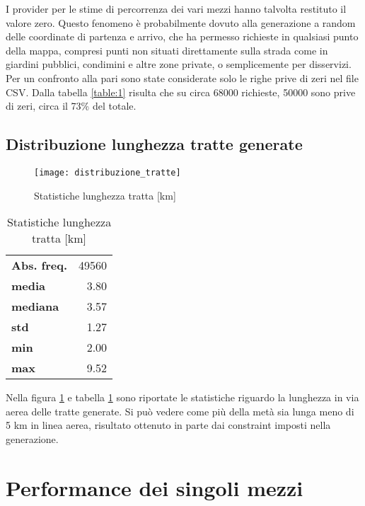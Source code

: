 I provider per le stime di percorrenza dei vari mezzi hanno talvolta restituto il valore zero. Questo fenomeno è probabilmente dovuto alla generazione a random delle coordinate di partenza e arrivo, che ha permesso richieste in qualsiasi punto della mappa, compresi punti non situati direttamente sulla strada come in giardini pubblici, condimini e altre zone private, o semplicemente per disservizi. Per un confronto alla pari sono state considerate solo le righe prive di zeri nel file CSV. Dalla tabella \ref{table:1}  risulta che su circa 68000 richieste, 50000 sono prive di zeri, circa il 73\% del totale.

\subsection{Distribuzione lunghezza tratte generate}

\begin{figure}[H]
\texttt{[image: distribuzione\_tratte]}
\caption{Statistiche lunghezza tratta [km]}
\label{image:2}
\end{figure}

\begin{table}[H]
\centering
\begin{tabular}{ | l r | }
\hline
\textbf{Abs. freq.} & 49560 \\
\textbf{media} & 3.80 \\
\textbf{mediana} & 3.57 \\
\textbf{std} & 1.27 \\
\textbf{min} & 2.00 \\
\textbf{max} & 9.52 \\
\hline
\end{tabular}
\caption{Statistiche lunghezza tratta [km]}
\label{table:2}
\end{table}

Nella  figura \ref{image:2} e tabella \ref{table:2} sono riportate le statistiche riguardo la lunghezza in via aerea delle tratte generate. Si può vedere come più della metà sia lunga meno di 5 km in linea aerea, risultato ottenuto in parte dai constraint imposti nella generazione.

\section{Performance dei singoli mezzi}


